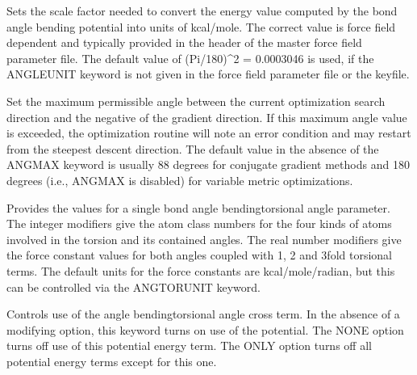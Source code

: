 \documentclass[letterpaper,11pt,english]{sphinxmanual}
\begin{document}
\ignorespaces {}\label{\detokenize{text/keywords:key-angleunit}}\begin{description}
\sphinxAtStartPar
Sets the scale factor needed to convert the energy value computed by the bond angle bending potential into units of kcal/mole. The correct value is force field dependent and typically provided in the header of the master force field parameter file. The default value of (Pi/180)\textasciicircum{}2 = 0.0003046 is used, if the ANGLEUNIT keyword is not given in the force field parameter file or the keyfile.

\end{description}

\ignorespaces {}\label{\detokenize{text/keywords:key-angmax}}\begin{description}
\sphinxAtStartPar
Set the maximum permissible angle between the current optimization search direction and the negative of the gradient direction. If this maximum angle value is exceeded, the optimization routine will note an error condition and may restart from the steepest descent direction. The default value in the absence of the ANGMAX keyword is usually 88 degrees for conjugate gradient methods and 180 degrees (i.e., ANGMAX is disabled) for variable metric optimizations.

\end{description}

\ignorespaces {}\label{\detokenize{text/keywords:key-angtors}}\begin{description}
\sphinxAtStartPar
Provides the values for a single bond angle bending\sphinxhyphen{}torsional angle parameter. The integer modifiers give the atom class numbers for the four kinds of atoms involved in the torsion and its contained angles. The real number modifiers give the force constant values for both angles coupled with 1\sphinxhyphen{}, 2\sphinxhyphen{} and 3\sphinxhyphen{}fold torsional terms. The default units for the force constants are kcal/mole/radian, but this can be controlled via the ANGTORUNIT keyword.

\end{description}

\ignorespaces {}\label{\detokenize{text/keywords:key-angtorterm}}\begin{description}
\sphinxAtStartPar
Controls use of the angle bending\sphinxhyphen{}torsional angle cross term. In the absence of a modifying option, this keyword turns on use of the potential. The NONE option turns off use of this potential energy term. The ONLY option turns off all potential energy terms except for this one.

\end{description}
\end{document}
